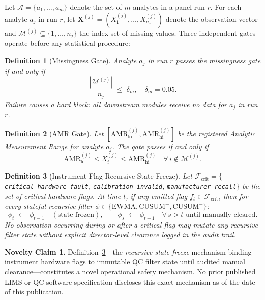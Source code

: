 \documentclass[11pt,a4paper]{article}
\newtheorem{definition}{Definition}[section]
\begin{document}
Let $\mathcal{A} = \{a_1, \ldots, a_m\}$ denote the set of $m$ analytes in
a panel run $r$. For each analyte $a_j$ in run $r$, let
$\mathbf{X}^{(j)} = (X_1^{(j)}, \ldots, X_{n_j}^{(j)})$ denote the observation
vector and $\mathcal{M}^{(j)} \subseteq \{1,\ldots,n_j\}$ the index set of
missing values. Three independent gates operate before any statistical procedure:

\begin{definition}[Missingness Gate]
Analyte $a_j$ in run $r$ passes the missingness gate if and only if
\[
  \frac{|\mathcal{M}^{(j)}|}{n_j} \;\le\; \delta_m, \quad \delta_m = 0.05.
\]
Failure causes a hard block: all downstream modules receive no data for $a_j$
in run $r$.
\end{definition}

\begin{definition}[AMR Gate]
Let $[\mathrm{AMR}_{\mathrm{lo}}^{(j)}, \mathrm{AMR}_{\mathrm{hi}}^{(j)}]$ be
the registered Analytic Measurement Range for analyte $a_j$. The gate passes if
and only if
\[
  \mathrm{AMR}_{\mathrm{lo}}^{(j)} \le X_i^{(j)} \le \mathrm{AMR}_{\mathrm{hi}}^{(j)}
  \quad \forall\, i \notin \mathcal{M}^{(j)}.
\]
\end{definition}

\begin{definition}[Instrument-Flag Recursive-State Freeze]
\label{def:freeze}
Let $\mathcal{F}_{\mathrm{crit}} = \{$\texttt{critical\_hardware\_fault},
\texttt{calibration\_invalid}, \texttt{manufacturer\_recall}$\}$ be the set of
critical hardware flags. At time $t$, if any emitted flag
$f_t \in \mathcal{F}_{\mathrm{crit}}$, then for every stateful recursive filter
$\phi \in \{\mathrm{EWMA}, \mathrm{CUSUM}^+, \mathrm{CUSUM}^-\}$:
\[
  \phi_t \;\leftarrow\; \phi_{t-1} \quad (\text{state frozen}),
  \qquad
  \phi_s \;\leftarrow\; \phi_{t-1} \quad \forall\, s > t \text{ until manually cleared}.
\]
No observation occurring during or after a critical flag may mutate any
recursive filter state without explicit director-level clearance logged in the
audit trail.
\end{definition}

\begin{noveltyenv}
\textbf{Novelty Claim 1.} Definition~\ref{def:freeze}---the \emph{recursive-state
freeze} mechanism binding instrument hardware flags to immutable QC filter state
until audited manual clearance---constitutes a novel operational safety
mechanism. No prior published LIMS or QC software specification discloses this
exact mechanism as of the date of this publication.
\end{noveltyenv}
\end{document}
